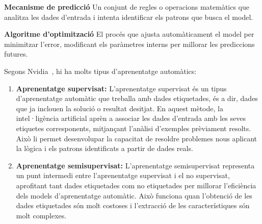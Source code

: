 \begin{enumerate}
\begin{itemize}
        {\color{gray}
        \item \textbf{Mecanisme de predicció}
        \subitem\hspace*{-1\leftmargin} Un conjunt de regles o operacions matemàtics que analitza les dades d'entrada i intenta identificar els patrons que busca el model.
        \item \textbf{Algoritme d'optimització}
        \subitem\hspace*{-1\leftmargin} El procés que ajusta automàticament el model per minimitzar l'error, modificant els paràmetres interns per millorar les prediccions futures.}
    \end{itemize}

    Segons Nvidia~\cite{Nvidia}, hi ha molts tipus d'aprenentatge automàtics:
    \begin{enumerate}
        \item \textbf{Aprenentatge supervisat:}
        L'aprenentatge supervisat és un tipus d'aprenentatge automàtic que treballa amb dades etiquetades, és a dir, dades que ja inclouen la solució o resultat desitjat. En aquest mètode, la intel·ligència artificial aprèn a associar les dades d'entrada amb les seves etiquetes corresponents, mitjançant l'anàlisi d'exemples prèviament resolts. Això li permet desenvolupar la capacitat de resoldre problemes nous aplicant la lògica i els patrons identificats a partir de dades reals.

        \item \textbf{Aprenentatge semisupervisat:}
        L'aprenentatge semisupervisat representa un punt intermedi entre l'aprenentatge supervisat i el no supervisat, aprofitant tant dades etiquetades com no etiquetades per millorar l'eficiència dels models d'aprenentatge automàtic. Això funciona quan l'obtenció de les dades etiquetades són molt costoses i l'extracció de les característiques són molt complexes.


\end{enumerate}
\end{enumerate}
